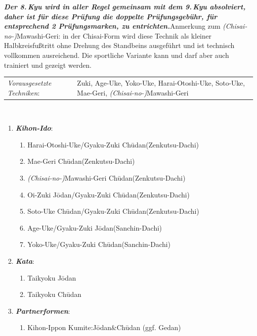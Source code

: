 \documentclass[a5paper,landscape,DIV=calc,11pt,notitlepage]{scrartcl}
\begin{document}
\begin{tcolorbox}[colback=white,colframe=YBELT,coltitle=black,title=8. Kyu: Gelb]
	\renewcommand{\labelenumi}{\alph{enumi}.)}
	\renewcommand{\labelenumii}{\arabic*.}
	{\scriptsize\textbf{\textit{Der 8.\,Kyu wird in aller Regel gemeinsam mit dem 9.\,Kyu absolviert, daher ist für diese Prüfung die doppelte Prüfungsgebühr, für entsprechend 2 Prüfungsmarken, zu entrichten.}}\newline Anmerkung zum \textit{(Chisai-no-)}Mawashi-Geri: in der Chisai-Form wird diese Technik als kleiner Halbkreisfußtritt ohne Drehung des Standbeins ausgeführt und ist technisch vollkommen ausreichend. Die sportliche Variante kann und darf aber auch trainiert und gezeigt werden.\newline
	\begin{tabularx}{\textwidth}{lX}
		\textit{Vorausgesetzte Techniken}:& Zuki, Age-Uke, Yoko-Uke, Harai-Otoshi-Uke, Soto-Uke, Mae-Geri, \textit{(Chisai-no-)}Mawashi-Geri
	\end{tabularx}\\}
	\begin{enumerate}[nosep]
		\item \textit{\textbf{Kihon-Ido}}:
		\begin{enumerate}[nosep]
			\item Harai-Otoshi-Uke/Gyaku-Zuki Ch\={u}dan\tabto{280pt}(Zenkutsu-Dachi)
			\item Mae-Geri Ch\={u}dan\tabto{280pt}(Zenkutsu-Dachi)
			\item \textit{(Chisai-no-)}Mawashi-Geri Ch\={u}dan\tabto{280pt}(Zenkutsu-Dachi)
			\item Oi-Zuki J\={o}dan/Gyaku-Zuki Ch\={u}dan\tabto{280pt}(Zenkutsu-Dachi)
			\item Soto-Uke Ch\={u}dan/Gyaku-Zuki Ch\={u}dan\tabto{280pt}(Zenkutsu-Dachi)
			\item Age-Uke/Gyaku-Zuki J\={o}dan\tabto{280pt}(Sanchin-Dachi)
			\item Yoko-Uke/Gyaku-Zuki Ch\={u}dan\tabto{280pt}(Sanchin-Dachi)
		\end{enumerate}
		\item \textit{\textbf{Kata}}:
		\begin{enumerate}[nosep]
			\item Taikyoku J\={o}dan
			\item Taikyoku Ch\={u}dan
		\end{enumerate}
		\item \textit{\textbf{Partnerformen}}:
		\begin{enumerate}[nosep]
			\item Kihon-Ippon Kumite:\tabto{280pt}J\={o}dan\&Ch\={u}dan (ggf. Gedan)
		\end{enumerate}
	\end{enumerate}
\end{tcolorbox}
\end{document}
